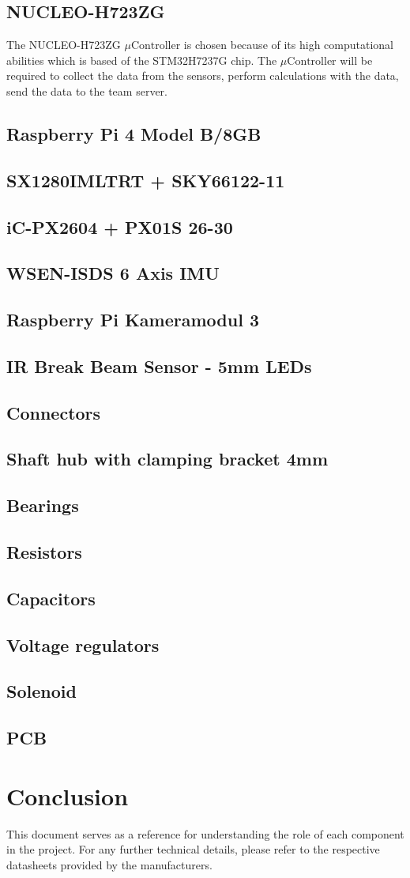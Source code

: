 \documentclass[a4paper,12pt]{article}
\begin{document}
  \subsection*{NUCLEO-H723ZG} The NUCLEO-H723ZG $\mu\text{Controller}$
  is chosen because of its high computational abilities which is based
  of the STM32H7237G chip. The $\mu\text{Controller}$ will be required
  to collect the data from the sensors, perform calculations with the
  data, send the data to the team server.

  \subsection*{Raspberry Pi 4 Model B/8GB} \subsection*{SX1280IMLTRT +
    SKY66122-11} \subsection*{iC-PX2604 + PX01S 26-30}
  \subsection*{WSEN-ISDS 6 Axis IMU} \subsection*{Raspberry Pi
    Kameramodul 3} \subsection*{IR Break Beam Sensor - 5mm LEDs}
  \subsection*{Connectors} \subsection*{Shaft hub with clamping bracket
    4mm} \subsection*{Bearings} \subsection*{Resistors}
  \subsection*{Capacitors} \subsection*{Voltage regulators}
  \subsection*{Solenoid} \subsection*{PCB} \section*{Conclusion} This
  document serves as a reference for understanding the role of each
  component in the project. For any further technical details, please
  refer to the respective datasheets provided by the manufacturers.
\end{document}
